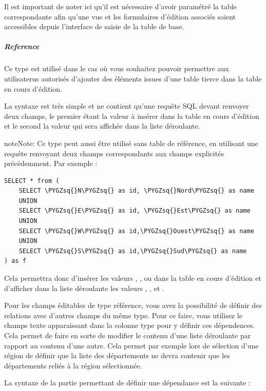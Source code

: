\documentclass[letterpaper,10pt,french]{sphinxmanual}
\def\PYGZsq{\char`\'}
\renewcommand\PYGZsq{\textquotesingle}
\begin{document}
Il est important de noter ici qu'il est nécessaire d'avoir paramétré
la table correspondante afin qu'une vue et les formulaires d'édition
associés soient accessibles depuis l'interface de saisie de la table
de base.


\subparagraph{Reference}
\label{tables/infopanel:reference}
Ce type est utilisé dans le cas où vous souhaitez pouvoir permettre
aux utilisaterus autorisés d'ajouter des éléments issues d'une table
tierce dans la table en cours d'édition.

La syntaxe est très simple et ne contient qu'une requête SQL devant
renvoyer deux champs, le premier étant la valeur à insérer dans la
table en cours d'édition et le second la valeur qui sera affichée dans
la liste déroulante.

\begin{notice}{note}{Note:}
Ce type peut aussi être utilisé sans table de référence, en
utilisant une requête renvoyant deux champs correspondants aux
champs explicités précédemment. Par exemple :

\begin{Verbatim}[commandchars=\\\{\}]
SELECT * from (
    SELECT \PYGZsq{}N\PYGZsq{} as id, \PYGZsq{}Nord\PYGZsq{} as name
    UNION
    SELECT \PYGZsq{}E\PYGZsq{} as id, \PYGZsq{}Est\PYGZsq{} as name
    UNION
    SELECT \PYGZsq{}W\PYGZsq{} as id,\PYGZsq{}Ouest\PYGZsq{} as name
    UNION
    SELECT \PYGZsq{}S\PYGZsq{} as id,\PYGZsq{}Sud\PYGZsq{} as name
) as f
\end{Verbatim}

Cela permettra donc d'insérer les valeurs , ,  ou
  dans la table en cours d'édition et d'afficher dans la
liste déroulante  les valeurs , ,  et .
\end{notice}

Pour les champs éditables de type référence, vous avez la possibilité
de définir des relations avec d'autres champs du même type. Pour ce
faire, vous utilisez le champs texte apparaissant dans la colonne
type pour y définir ces dépendences. Cela permet de faire en sorte de
modifier le contenu d'une liste déroulante par rapport au contenu
d'une autre. Cela permet par exemple lors de sélection d'une région de
définir que la liste des départements ne devra contenir que les
départements reliés à la région sélectionnée.

La syntaxe de la partie permettant de définir une dépendance est la
suivante :
\end{document}
